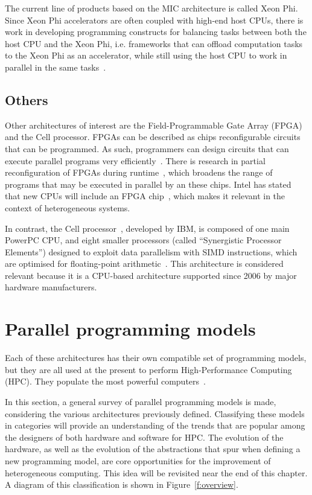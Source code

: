 The current line of products based on the MIC architecture is called Xeon Phi. Since Xeon Phi accelerators are often coupled with high-end host CPUs, there is work in developing programming constructs for balancing tasks between both the host CPU and the Xeon Phi, i.e. frameworks that can offload computation tasks to the Xeon Phi as an accelerator, while still using the host CPU to work in parallel in the same tasks~\cite{dokulil2012efficient}.

\subsection{Others}

Other architectures of interest are the Field-Programmable Gate Array (FPGA) and the Cell processor. FPGAs can be described as chips reconfigurable circuits that can be programmed. As such, programmers can design circuits that can execute parallel programs very efficiently~\cite{singh2011implementing}. There is research in partial reconfiguration of FPGAs during runtime~\cite{koch2012partial}, which broadens the range of programs that may be executed in parallel by an these chips. Intel has stated that new CPUs will include an FPGA chip~\cite{1_anthony_2015}, which makes it relevant in the context of heterogeneous systems.

In contrast, the Cell processor~\cite{gschwind2006synergistic}, developed by IBM, is composed of one main PowerPC CPU, and eight smaller processors (called ``Synergistic Processor Elements'') designed to exploit data parallelism with SIMD instructions, which are optimised for floating-point arithmetic~\cite{tsuchiyama2010opencl}. This architecture is considered relevant because it is a CPU-based architecture supported since 2006 by major hardware manufacturers.



\section{Parallel programming models}

Each of these architectures has their own compatible set of programming models, but they are all used at the present to perform High-Performance Computing (\gls{HPC}). They populate the most powerful computers~\cite{2_top500.org_2015}.

In this section, a general survey of parallel programming models is made, considering the various architectures previously defined. Classifying these models in categories will provide an understanding of the trends that are popular among the designers of both hardware and software for HPC. The evolution of the hardware, as well as the evolution of the abstractions that spur when defining a new programming model, are core opportunities for the improvement of heterogeneous computing. This idea will be revisited near the end of this chapter. A diagram of this classification is shown in Figure~\ref{f:overview}.


